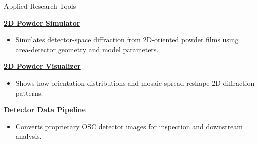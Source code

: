 \begin{rubric}{Applied Research Tools}

\entry*[2021--Present]%
  \textbf{\href{https://github.com/DVBeckwitt/ra_sim}{2D Powder Simulator}}%
  \begin{itemize}[nosep,topsep=0pt,partopsep=0pt,leftmargin=1.2em]
    \item Simulates detector-space diffraction from 2D-oriented powder films using area-detector geometry and model parameters.
  \end{itemize}
\entry*[2021--Present]%
  \textbf{\href{https://github.com/DVBeckwitt/2D_Mosaic_Sim}{2D Powder Visualizer}}%
  \begin{itemize}[nosep,topsep=0pt,partopsep=0pt,leftmargin=1.2em]
    \item Shows how orientation distributions and mosaic spread reshape 2D diffraction patterns.
  \end{itemize}
\entry*[2021--Present]%
  \textbf{\href{https://github.com/DVBeckwitt/OSC_Reader}{Detector Data Pipeline}}%
  \begin{itemize}[nosep,topsep=0pt,partopsep=0pt,leftmargin=1.2em]
    \item Converts proprietary OSC detector images for inspection and downstream analysis.
  \end{itemize}

\end{rubric}
